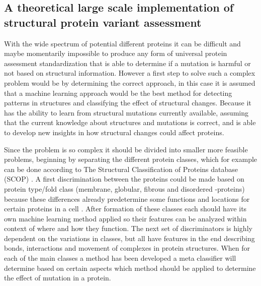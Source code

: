 \subsection{A theoretical large scale implementation of structural protein variant assessment}
With the wide spectrum of potential different proteins it can be difficult and maybe momentarily impossible to produce any form of universal protein assessment standardization that is able to determine if a mutation is harmful or not based on structural information. However a first step to solve such a complex problem would be by determining the correct approach, in this case it is assumed that a machine learning approach would be the best method for detecting patterns in structures and classifying the effect of structural changes. Because it has the ability to learn from structural mutations currently available, assuming that the current knowledge about structures and mutations is correct, and is able to develop new insights in how structural changes could affect proteins. 

Since the problem is so complex it should be divided into smaller more feasible problems, beginning by separating the different protein classes, which  for example can be done according to The Structural Classification of Proteins database (SCOP) \cite{andreeva_scop2_2014}. A first discrimination between the proteins could be made based on protein type/fold class (membrane, globular, fibrous and disordered -proteins) because these differences already predetermine some functions and locations for certain proteins in a cell \cite{wikipedia_membrane_2019, wikipedia_globular_2019,wikipedia_scleroprotein_2018,wikipedia_intrinsically_2019}. After formation of these classes each should have its own machine learning method applied so their features can be analyzed within context of where and how they function. The next set of discriminators is highly dependent on the variations in classes, but all have features in the end describing bonds, interactions and movement of complexes in protein structures. When for each of the main classes a method has been developed a meta classifier will determine based on certain aspects which method should be applied to determine the effect of mutation in a protein.
\label{subsec:GD_theoratical_large_scale_implementation}